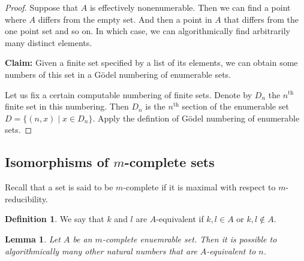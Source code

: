 \documentclass[10pt, letterpaper]{article}
\newtheorem{lemma}{Lemma}
\theoremstyle{remark}
\theoremstyle{definition}
\newtheorem{defn}{Definition}
\begin{document}
    \begin{proof}
        Suppose that $A$ is effectively nonenumerable. Then we can find a point where $A$ differs from the empty set. And then a point
        in $A$ that differs from the one point set and so on. In which case, we can algorithmically find arbitrarily many distinct 
        elements.

        \textbf{Claim: } Given a finite set specified by a list of its elements, we can obtain some numbers of this set in a G\"{o}del 
        numbering of enumerable sets.

        Let us fix a certain computable numbering of finite sets. Denote by $D_n$ the $n^{\text{th}}$ finite set in this numbering.
        Then $D_n$ is the $n^{\text{th}}$ section of the enumerable set $D = \{(n,x) \mid x \in D_n\}$. Apply the defintion of 
        G\"{o}del numbering of enumerable sets.
    \end{proof}

    \subsection*{Isomorphisms of $m$-complete sets}

    Recall that a set is said to be $m$-complete if it is maximal with respect to $m$-reducibility.

    \begin{defn}
        We say that $k$ and $l$ are $A$-equivalent if $k,l \in A$ or $k,l \notin A$.
    \end{defn}

    \begin{lemma}
        Let $A$ be an $m$-complete enuemrable set. Then it is possible to algorithmically many other natural numbers that are $A$-equivalent to $n$.
    \end{lemma}
\end{document}
